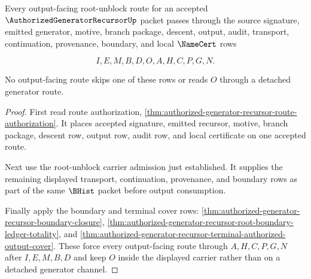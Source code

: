 \begin{theorem}
\label{thm:authorized-generator-recursor-root-unblock-route-totality}
Every output-facing root-unblock route for an accepted $\AuthorizedGeneratorRecursorUp$ packet passes through the source signature, emitted generator, motive, branch package, descent, output, audit, transport, continuation, provenance, boundary, and local $\NameCert$ rows

$$
I,E,M,B,D,O,A,H,C,P,G,N.
$$

No output-facing route skips one of these rows or reads $O$ through a detached generator route.
\end{theorem}
\begin{proof}
First read route authorization, \autoref{thm:authorized-generator-recursor-route-authorization}. It places accepted signature, emitted recursor, motive, branch package, descent row, output row, audit row, and local certificate on one accepted route.

Next use the root-unblock carrier admission just established. It supplies the remaining displayed transport, continuation, provenance, and boundary rows as part of the same $\BHist$ packet before output consumption.

Finally apply the boundary and terminal cover rows: \autoref{thm:authorized-generator-recursor-boundary-closure}, \autoref{thm:authorized-generator-recursor-root-boundary-ledger-totality}, and \autoref{thm:authorized-generator-recursor-terminal-authorized-output-cover}. These force every output-facing route through $A,H,C,P,G,N$ after $I,E,M,B,D$ and keep $O$ inside the displayed carrier rather than on a detached generator channel.
\end{proof}

